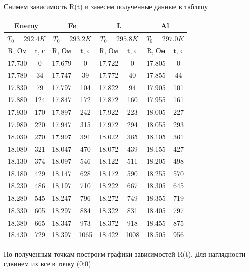 \documentclass[12pt,a4paper]{article}
\begin{document}
Снимем зависимость R(t) и занесем полученные данные в таблицу
\begin{center}
\begin{tabular}{|c|c|c|c|c|c|c|c|}
\hline 
\multicolumn{2}{|c|}{Enemy} & \multicolumn{2}{|c|}{Fe} & \multicolumn{2}{|c|}{L} & \multicolumn{2}{|c|}{Al} \\ 
\hline 
\multicolumn{2}{|c|}{$T_{0} = 292.4 K$} & \multicolumn{2}{|c|}{$T_{0} = 293.2 K$} & \multicolumn{2}{|c|}{$T_{0} = 295.8 K$} & \multicolumn{2}{|c|}{$T_{0} = 297.0 K$} \\ 
\hline 
R, Ом & t, с & R, Ом & t, с & R, Ом & t, с & R, Ом & t, с \\ 
\hline 
17.730 & 0 & 17.679 & 0 & 17.722 & 0 & 17.805 & 0 \\ 
\hline 
17.780 & 34 & 17.747 & 39 & 17.772 & 40 & 17.855 & 44 \\ 
\hline 
17.830 & 79 & 17.797 & 104 & 17.822 & 94 & 17.905 & 101 \\ 
\hline 
17.880 & 124 & 17.847 & 172 & 17.872 & 160 & 17.955 & 161 \\ 
\hline 
17.930 & 170 & 17.897 & 242 & 17.922 & 223 & 18.005 & 227 \\ 
\hline 
17.980 & 220 & 17.947 & 315 & 17.972 & 294 & 18.055 & 293 \\ 
\hline 
18.030 & 270 & 17.997 & 391 & 18.022 & 365 & 18.105 & 361 \\ 
\hline 
18.080 & 321 & 18.047 & 470 & 18.072 & 439 & 18.155 & 427 \\ 
\hline 
18.130 & 374 & 18.097 & 546 & 18.122 & 511 & 18.205 & 498 \\ 
\hline 
18.180 & 429 & 18.147 & 628 & 18.172 & 590 & 18.255 & 570 \\ 
\hline 
18.230 & 486 & 18.197 & 710 & 18.222 & 667 & 18.305 & 645 \\ 
\hline 
18.280 & 545 & 18.247 & 796 & 18.272 & 749 & 18.355 & 719 \\ 
\hline 
18.330 & 605 & 18.297 & 884 & 18.322 & 831 & 18.405 & 797 \\ 
\hline 
18.380 & 665 & 18.347 & 973 & 18.372 & 918 & 18.455 & 875 \\ 
\hline 
18.430 & 729 & 18.397 & 1065 & 18.422 & 1008 & 18.505 & 956 \\ 
\hline 
\end{tabular} 
\end{center}

По полученным точкам построим графики зависимостей R(t). Для наглядности сдвинем их все в точку (0;0)
\end{document}

